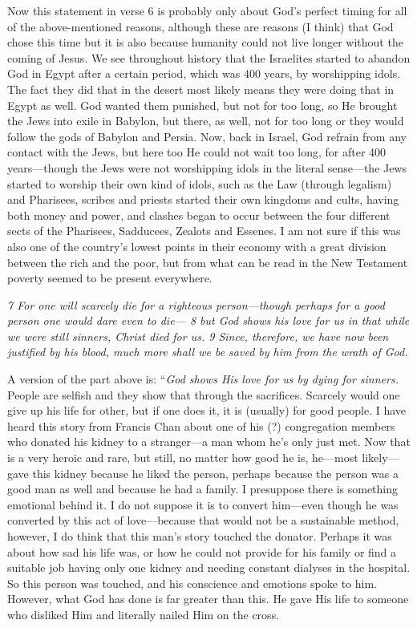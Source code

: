 Now this statement in verse 6 is probably only about God's perfect
timing for all of the above-mentioned reasons, although these are
reasons (I think) that God chose this time but it is also because
humanity could not live longer without the coming of Jesus. We see
throughout history that the Israelites started to abandon God in Egypt
after a certain period, which was 400 years, by worshipping idols. The
fact they did that in the desert most likely means they were doing that
in Egypt as well. God wanted them punished, but not for too long, so He
brought the Jews into exile in Babylon, but there, as well, not for too
long or they would follow the gods of Babylon and Persia. Now, back in
Israel, God refrain from any contact with the Jews, but here too He
could not wait too long, for after 400 years---though the Jews were not
worshipping idols in the literal sense---the Jews started to worship
their own kind of idols, such as the Law (through legalism) and
Pharisees, scribes and priests started their own kingdoms and cults,
having both money and power, and clashes began to occur between the four
different sects of the Pharisees, Sadducees, Zealots and Essenes. I am
not sure if this was also one of the country's lowest points in their
economy with a great division between the rich and the poor, but from
what can be read in the New Testament poverty seemed to be present
everywhere.

\emph{7 For one will scarcely die for a righteous person---though
perhaps for a good person one would dare even to die--- 8 but God shows
his love for us in that while we were still sinners, Christ died for us.
9 Since, therefore, we have now been justified by his blood, much more
shall we be saved by him from the wrath of God.}

A version of the part above is: ``\emph{God shows His love for us by
dying for sinners.} People are selfish and they show that through the
sacrifices. Scarcely would one give up his life for other, but if one
does it, it is (usually) for good people. I have heard this story from
Francis Chan about one of his (?) congregation members who donated his
kidney to a stranger---a man whom he's only just met. Now that is a very
heroic and rare, but still, no matter how good he is, he---most
likely---gave this kidney because he liked the person, perhaps because
the person was a good man as well and because he had a family. I
presuppose there is something emotional behind it. I do not suppose it
is to convert him---even though he was converted by this act of
love---because that would not be a sustainable method, however, I do
think that this man's story touched the donator. Perhaps it was about
how sad his life was, or how he could not provide for his family or find
a suitable job having only one kidney and needing constant dialyses in
the hospital. So this person was touched, and his conscience and
emotions spoke to him. However, what God has done is far greater than
this. He gave His life to someone who disliked Him and literally nailed
Him on the cross.

